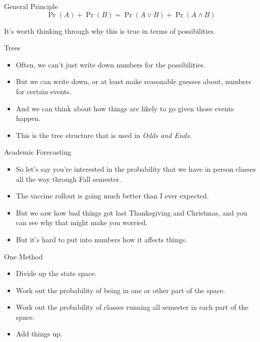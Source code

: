 \documentclass[
  ignorenonframetext,
]{beamer}
\providecommand{\tightlist}{%
  \setlength{\itemsep}{0pt}\setlength{\parskip}{0pt}}
\renewcommand{\,}{\text{, }}
\begin{document}
\begin{frame}{General Principle}
\protect\hypertarget{general-principle}{}
\[
\Pr(A) + \Pr(B) = \Pr(A \vee B) + \Pr(A \wedge B)
\]

\pause

It's worth thinking through why this is true in terms of possibilities.
\end{frame}

\begin{frame}{Trees}
\protect\hypertarget{trees}{}
\begin{itemize}
\tightlist
\item
  Often, we can't just write down numbers for the possibilities.
\item
  But we can write down, or at least make reasonable guesses about,
  numbers for certain events.
\item
  And we can think about how things are likely to go given those events
  happen.
\item
  This is the tree structure that is used in \emph{Odds and Ends}.
\end{itemize}
\end{frame}

\begin{frame}{Academic Forecasting}
\protect\hypertarget{academic-forecasting}{}
\begin{itemize}
\tightlist
\item
  So let's say you're interested in the probability that we have in
  person classes all the way through Fall semester.
\item
  The vaccine rollout is going much better than I ever expected.
\item
  But we saw how bad things got last Thanksgiving and Christmas, and you
  can see why that might make you worried.
\item
  But it's hard to put into numbers how it affects things.
\end{itemize}
\end{frame}

\begin{frame}{One Method}
\protect\hypertarget{one-method}{}
\begin{itemize}
\tightlist
\item
  Divide up the state space.
\item
  Work out the probability of being in one or other part of the space.
\item
  Work out the probability of classes running all semester in each part
  of the space.
\item
  Add things up.
\end{itemize}
\end{frame}
\end{document}
